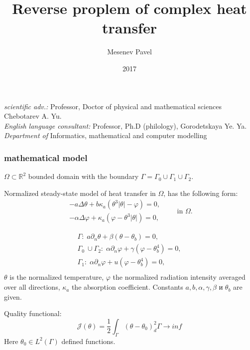 \documentclass[9pt]{beamer}
\begin{document}
    \title{Reverse proplem of complex heat transfer}
    \author{Mesenev Pavel}

    \date{2017}
\begin{frame}
    \titlepage
    \begin{minipage}{1\textwidth} %
    \begin{flushleft} %
    \emph{scientific adv.:} Professor, Doctor of physical and mathematical sciences Chebotarev A. Yu.\\
    \emph{English language consultant:} Professor, Ph.D (philology), Gorodetskaya Ye. Ya.
    \emph{Department of} Informatics, mathematical and computer modelling\\
    \end{flushleft} %
    \end{minipage} %
\end{frame}

\begin{frame}
\frametitle{mathematical model}

$\Omega \subset \mathbb{R}^2$ bounded domain with the boundary $\Gamma = \Gamma_0 \cup \Gamma_1 \cup \Gamma_2$.

Normalized steady-state model of heat transfer in  $\Omega$, has the following form:
\begin{equation}
    \label{initial}
    \begin{aligned}
                - a \Delta \theta + b \kappa_a(\theta ^ 3 | \theta | - \varphi) = 0,  \\
                - \alpha \Delta \varphi + \kappa_a (\varphi - \theta ^3 | \theta |) = 0,
    \end{aligned}
    \qquad \text{in } \Omega.
\end{equation}

\begin{equation}
    \label{initial_boundary}
    \begin{aligned}
        \Gamma: \; a \partial_n \theta + \beta (\theta - \theta _b) = 0, \\
        \Gamma_0 \ \cup \Gamma_2: \; \alpha \partial_n \varphi + \gamma(\varphi - \theta_b ^4 ) = 0, \\
        \Gamma_1: \; \alpha \partial_n \varphi + u(\varphi - \theta_b ^4 ) = 0, \\
    \end{aligned}
\end{equation}
$\theta$ is the normalized temperature, $\varphi$ the normalized radiation intensity averaged over all directions,  $\kappa_a$ the absorption coefficient. Constants $a, b, \alpha, \gamma, \beta$ и $\theta_b$ are given.

    Quality functional:
    \begin{equation}
    	\label{quality}
    	\mathcal{J}(\theta) = \frac{1}{2} \int_\Gamma (\theta - \theta_0)^2_d\Gamma \rightarrow inf
    \end{equation}
    Here $ \theta_0  \in L^2(\Gamma)$ defined functions.
\end{frame}
\end{document}
